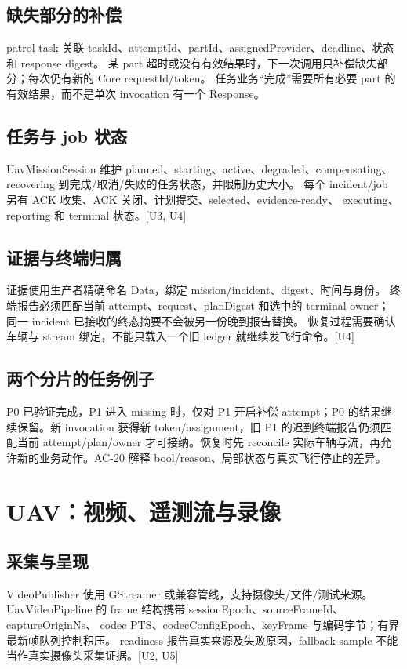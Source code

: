 \subsection{缺失部分的补偿}
patrol task 关联 taskId、attemptId、partId、assignedProvider、deadline、状态和 response digest。
某 part 超时或没有有效结果时，下一次调用只补偿缺失部分；每次仍有新的 Core requestId/token。
任务业务“完成”需要所有必要 part 的有效结果，而不是单次 invocation 有一个 Response。

\subsection{任务与 job 状态}
UavMissionSession 维护 planned、starting、active、degraded、compensating、recovering
到完成/取消/失败的任务状态，并限制历史大小。
每个 incident/job 另有 ACK 收集、ACK 关闭、计划提交、selected、evidence-ready、
executing、reporting 和 terminal 状态。[U3, U4]

\subsection{证据与终端归属}
证据使用生产者精确命名 Data，绑定 mission/incident、digest、时间与身份。
终端报告必须匹配当前 attempt、request、planDigest 和选中的 terminal owner；
同一 incident 已接收的终态摘要不会被另一份晚到报告替换。
恢复过程需要确认车辆与 stream 绑定，不能只载入一个旧 ledger 就继续发飞行命令。[U4]



\subsection{两个分片的任务例子}
P0 已验证完成，P1 进入 missing 时，仅对 P1 开启补偿 attempt；P0 的结果继续保留。新 invocation 获得新 token/assignment，旧 P1 的迟到终端报告仍须匹配当前 attempt/plan/owner 才可接纳。恢复时先 reconcile 实际车辆与流，再允许新的业务动作。AC-20 解释 bool/reason、局部状态与真实飞行停止的差异。

\newpage

\section{UAV：视频、遥测流与录像}
\subsection{采集与呈现}
VideoPublisher 使用 GStreamer 或兼容管线，支持摄像头/文件/测试来源。
UavVideoPipeline 的 frame 结构携带 sessionEpoch、sourceFrameId、captureOriginNs、
codec PTS、codecConfigEpoch、keyFrame 与编码字节；有界最新帧队列控制积压。
readiness 报告真实来源及失败原因，fallback sample 不能当作真实摄像头采集证据。[U2, U5]

